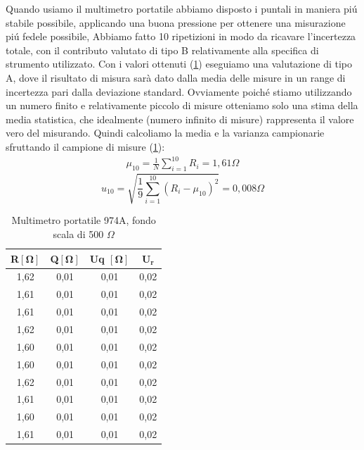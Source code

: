 Quando usiamo il multimetro portatile abbiamo disposto i puntali in maniera pi\'u stabile possibile, applicando una buona pressione per ottenere una misurazione pi\'u fedele possibile,
Abbiamo fatto 10 ripetizioni in modo da ricavare l'incertezza totale, con il contributo valutato di tipo B relativamente alla specifica di strumento utilizzato.
\newline
\newline
Con i valori ottenuti (\ref{tab:mult_port}) eseguiamo una valutazione di tipo A, dove il risultato di misura sarà dato dalla media delle misure in un range di incertezza pari dalla deviazione standard. Ovviamente poich\'e stiamo utilizzando un numero finito e relativamente piccolo di misure otteniamo solo una stima della media statistica, che idealmente (numero infinito di misure) rappresenta il valore vero del misurando. Quindi calcoliamo la media e la varianza campionarie sfruttando il campione di misure (\ref{tab:mult_port}):
\begin{align*}
    \mu_{10}=\frac{1}{N}\sum_{i=1}^{10}R_{i}=1,61\Omega
\end{align*}
\begin{equation*}
    u_{10}=\sqrt{\frac{1}{9}\sum_{i=1}^{10}(R_i-\mu_{10})^{2}}=0,008\Omega 
\end{equation*}
\FloatBarrier

\begin{table}[!ht]
    \centering
    \caption{Multimetro portatile 974A, fondo scala di 500 $\Omega$}
    \begin{tabular}{|c|c|c|c|}
    \hline
        \textbf{R}$\bm{[\Omega]}$ & \textbf{Q}$\bm{[\Omega]}$ & \textbf{Uq} $\bm{[\Omega]}$ & $\bm{U_r}$ \\ \hline
        1,62 & 0,01 & 0,01 & 0,02  \\ \hline
        1,61 & 0,01 & 0,01 & 0,02  \\ \hline
        1,61 & 0,01 & 0,01 & 0,02  \\ \hline
        1,62 & 0,01 & 0,01 & 0,02  \\ \hline
        1,60 & 0,01 & 0,01 & 0,02  \\ \hline
        1,60 & 0,01 & 0,01 & 0,02  \\ \hline
        1,62 & 0,01 & 0,01 & 0,02  \\ \hline
        1,61 & 0,01 & 0,01 & 0,02  \\ \hline
        1,60 & 0,01 & 0,01 & 0,02  \\ \hline
        1,61 & 0,01 & 0,01 & 0,02 \\ \hline
    \end{tabular}
    
    \label{tab:mult_port}
\end{table}
\FloatBarrier
\clearpage


